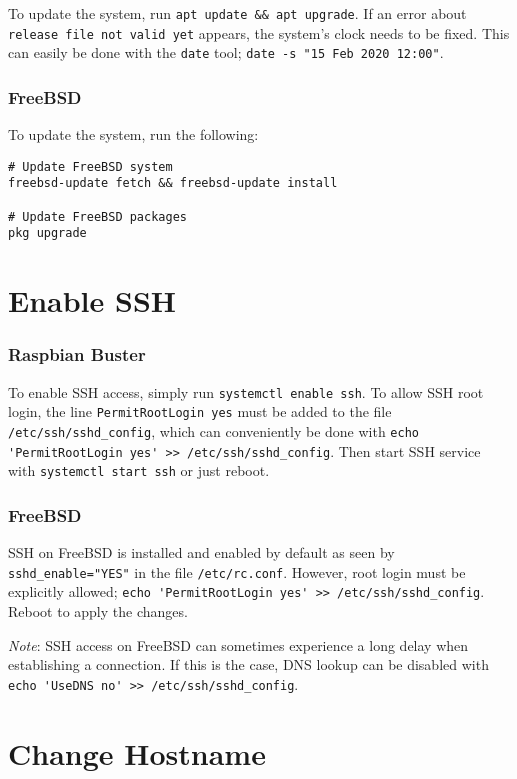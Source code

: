 To update the system, run \lstinline{apt update && apt upgrade}. If an error about \lstinline{release file not valid yet} appears, the system's clock needs to be fixed. This can easily be done with the \lstinline{date} tool; \lstinline{date -s "15 Feb 2020 12:00"}.

\subsubsection{FreeBSD}

To update the system, run the following:

\begin{verbatim}
# Update FreeBSD system
freebsd-update fetch && freebsd-update install

# Update FreeBSD packages
pkg upgrade
\end{verbatim}


\section{Enable SSH} \label{enable_ssh}

\subsubsection{Raspbian Buster}

To enable SSH access, simply run \lstinline{systemctl enable ssh}. To allow SSH root login, the line \lstinline{PermitRootLogin yes} must be added to the file \lstinline{/etc/ssh/sshd_config}, which can conveniently be done with \lstinline{echo 'PermitRootLogin yes' >> /etc/ssh/sshd_config}. Then start SSH service with \lstinline{systemctl start ssh} or just reboot.

\subsubsection{FreeBSD}

SSH on FreeBSD is installed and enabled by default as seen by \lstinline{sshd_enable="YES"} in the file \lstinline{/etc/rc.conf}. However, root login must be explicitly allowed; \lstinline{echo 'PermitRootLogin yes' >> /etc/ssh/sshd_config}. Reboot to apply the changes.

\textit{Note}: SSH access on FreeBSD can sometimes experience a long delay when establishing a connection. If this is the case, DNS lookup can be disabled with \lstinline{echo 'UseDNS no' >> /etc/ssh/sshd_config}.


\section{Change Hostname} \label{change_hostname}

